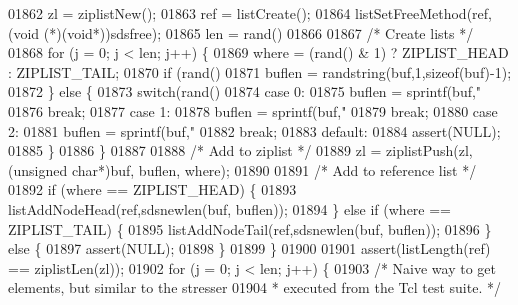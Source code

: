 \begin{DoxyCode}
{{{{{{{{{{{{{{{{{{{{{{{{{{{{{{01862             zl = ziplistNew();
01863             ref = listCreate();
01864             listSetFreeMethod(ref,(\textcolor{keywordtype}{void} (*)(\textcolor{keywordtype}{void}*))sdsfree);
01865             len = rand() %
01866 
01867             \textcolor{comment}{/* Create lists */}
01868             \textcolor{keywordflow}{for} (j = 0; j < len; j++) \{
01869                 where = (rand() & 1) ? ZIPLIST\_HEAD : ZIPLIST\_TAIL;
01870                 \textcolor{keywordflow}{if} (rand() %
01871                     buflen = randstring(buf,1,\textcolor{keyword}{sizeof}(buf)-1);
01872                 \} \textcolor{keywordflow}{else} \{
01873                     \textcolor{keywordflow}{switch}(rand() %
01874                     \textcolor{keywordflow}{case} 0:
01875                         buflen = sprintf(buf,\textcolor{stringliteral}{"%
01876                         \textcolor{keywordflow}{break};
01877                     \textcolor{keywordflow}{case} 1:
01878                         buflen = sprintf(buf,\textcolor{stringliteral}{"%
01879                         \textcolor{keywordflow}{break};
01880                     \textcolor{keywordflow}{case} 2:
01881                         buflen = sprintf(buf,\textcolor{stringliteral}{"%
01882                         \textcolor{keywordflow}{break};
01883                     \textcolor{keywordflow}{default}:
01884                         assert(NULL);
01885                     \}
01886                 \}
01887 
01888                 \textcolor{comment}{/* Add to ziplist */}
01889                 zl = ziplistPush(zl, (\textcolor{keywordtype}{unsigned} \textcolor{keywordtype}{char}*)buf, buflen, where);
01890 
01891                 \textcolor{comment}{/* Add to reference list */}
01892                 \textcolor{keywordflow}{if} (where == ZIPLIST\_HEAD) \{
01893                     listAddNodeHead(ref,sdsnewlen(buf, buflen));
01894                 \} \textcolor{keywordflow}{else} \textcolor{keywordflow}{if} (where == ZIPLIST\_TAIL) \{
01895                     listAddNodeTail(ref,sdsnewlen(buf, buflen));
01896                 \} \textcolor{keywordflow}{else} \{
01897                     assert(NULL);
01898                 \}
01899             \}
01900 
01901             assert(listLength(ref) == ziplistLen(zl));
01902             \textcolor{keywordflow}{for} (j = 0; j < len; j++) \{
01903                 \textcolor{comment}{/* Naive way to get elements, but similar to the stresser}
01904 \textcolor{comment}{                 * executed from the Tcl test suite. */}
}}}}}}}}}}}}}}}}}}}}}}}}}}}}}}}}}
\end{DoxyCode}
